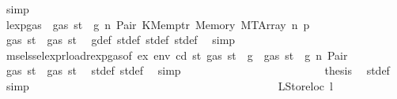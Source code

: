 \begin{isabellebody}
\ simp\isanewline
\ \ \ \ \ \ \ \ \ \ \ \ \ \ \ \ \ \ \ \ \ \ \isamarkupfalse%
\ \isamarkupfalse%
\ lexp{\isacharunderscore}{\kern0pt}gas\ {\isacharbackquoteopen}{\isasymnot}\ gas\ st\ {\isasymle}\ g{\isacharbackquoteclose}\ n\ Pair\ KMemptr\ Memory\ MTArray\ n{}\ p{}\ \isamarkupfalse%
\ {\isachardoublequoteopen}gas\ st{\isacharprime}{\kern0pt}{\isacharprime}{\kern0pt}{\isacharprime}{\kern0pt}\ {\isasymle}\ gas\ st{\isacharprime}{\kern0pt}{\isacharprime}{\kern0pt}{\isachardoublequoteclose}\ \isamarkupfalse%
\ g{\isacharunderscore}{\kern0pt}def\ st{\isacharprime}{\kern0pt}{\isacharunderscore}{\kern0pt}def\ st{\isacharprime}{\kern0pt}{\isacharprime}{\kern0pt}{\isacharunderscore}{\kern0pt}def\ st{\isacharprime}{\kern0pt}{\isacharprime}{\kern0pt}{\isacharprime}{\kern0pt}{\isacharunderscore}{\kern0pt}def\ \isamarkupfalse%
\ simp\isanewline
\ \ \ \ \ \ \ \ \ \ \ \ \ \ \ \ \ \ \ \ \ \ \isamarkupfalse%
\ \isamarkupfalse%
\ msel{\isacharunderscore}{\kern0pt}ssel{\isacharunderscore}{\kern0pt}expr{\isacharunderscore}{\kern0pt}load{\isacharunderscore}{\kern0pt}rexp{\isacharunderscore}{\kern0pt}gas{\isacharparenleft}{\kern0pt}{}{\isacharparenright}{\kern0pt}{\isacharbrackleft}{\kern0pt}of\ ex\ env\ cd\ st{\isacharprime}{\kern0pt}\ {\isachardoublequoteopen}gas\ st\ {\isacharminus}{\kern0pt}\ g{\isachardoublequoteclose}{\isacharbrackright}{\kern0pt}\ {\isacharbackquoteopen}{\isasymnot}\ gas\ st\ {\isasymle}\ g{\isacharbackquoteclose}\ n\ Pair\ \isamarkupfalse%
\ {\isachardoublequoteopen}gas\ st{\isacharprime}{\kern0pt}{\isacharprime}{\kern0pt}\ {\isasymle}\ gas\ st{\isacharprime}{\kern0pt}{\isachardoublequoteclose}\ \isamarkupfalse%
\ st{\isacharprime}{\kern0pt}{\isacharunderscore}{\kern0pt}def\ st{\isacharprime}{\kern0pt}{\isacharprime}{\kern0pt}{\isacharunderscore}{\kern0pt}def\ \isamarkupfalse%
\ simp\isanewline
\ \ \ \ \ \ \ \ \ \ \ \ \ \ \ \ \ \ \ \ \ \ \isamarkupfalse%
\ \isamarkupfalse%
\ {\isacharquery}{\kern0pt}thesis\ \isamarkupfalse%
\ st{\isacharprime}{\kern0pt}{\isacharunderscore}{\kern0pt}def\ \isamarkupfalse%
\ simp\isanewline
\ \ \ \ \ \ \ \ \ \ \ \ \ \ \ \ \ \ \ \ \isamarkupfalse%
\isanewline
\ \ \ \ \ \ \ \ \ \ \ \ \ \ \ \ \ \ \ \ \ \ \isamarkupfalse%
\ {\isacharparenleft}{\kern0pt}LStoreloc\ l{\isacharparenright}{\kern0pt}\isanewline
\ \ \ \ \ \ \ \ \ \ \ \ \ \ \ \ \ \ \ \ \ \ \isamarkupfalse%

\end{isabellebody}
